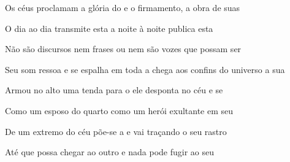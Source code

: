 \begin{multicols}{2}
    \begin{greenumerate}
      \item {}Os céus proclamam a glória do  e o firmamento, a obra de suas 

      \item {}O dia ao dia transmite esta  a noite à noite publica esta 

      \item {}Não são discursos nem frases ou  nem são vozes que possam ser 

      \item {}Seu som ressoa e se espalha em toda a  chega aos confins do universo a sua 

      \item {}Armou no alto uma tenda para o  ele desponta no céu e se 

      \item {}Como um esposo do quarto  como um herói exultante em seu 

      \item {}De um extremo do céu põe-se a  e vai traçando o seu rastro 

      \item {}Até que possa chegar ao outro  e nada pode fugir ao seu 
    \end{greenumerate}
  \end{multicols}